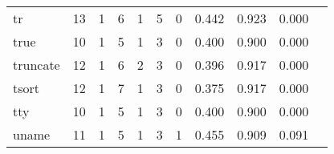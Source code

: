 \begin{longtable}{lp{1.2cm}p{1.2cm}p{1.2cm}p{1.2cm}p{1.2cm}p{1.2cm}p{1.2cm}p{1.2cm}p{1.2cm}p{1.2cm}}
tr        &                                    13 &                                                  1 &                                                  6 &                                                  1 &                                                  5 &                                                  0 &                                              0.442 &                                              0.923 &                                              0.000 \\
true      &                                    10 &                                                  1 &                                                  5 &                                                  1 &                                                  3 &                                                  0 &                                              0.400 &                                              0.900 &                                              0.000 \\
truncate  &                                    12 &                                                  1 &                                                  6 &                                                  2 &                                                  3 &                                                  0 &                                              0.396 &                                              0.917 &                                              0.000 \\
tsort     &                                    12 &                                                  1 &                                                  7 &                                                  1 &                                                  3 &                                                  0 &                                              0.375 &                                              0.917 &                                              0.000 \\
tty       &                                    10 &                                                  1 &                                                  5 &                                                  1 &                                                  3 &                                                  0 &                                              0.400 &                                              0.900 &                                              0.000 \\
uname     &                                    11 &                                                  1 &                                                  5 &                                                  1 &                                                  3 &                                                  1 &                                              0.455 &                                              0.909 &                                              0.091 \\

\end{longtable}
